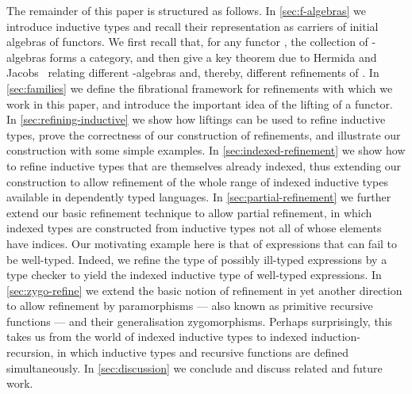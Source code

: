 \documentclass{LMCS}
\begin{document}
The remainder of this paper is structured as follows. In
\autoref{sec:f-algebras} we introduce inductive types and recall their
representation as carriers of initial algebras of functors. We first
recall that, for any functor , the collection of -algebras
forms a category, and then give a key theorem due to Hermida and
Jacobs~\cite{hermida98structural} relating different -algebras and,
thereby, different refinements of . In \autoref{sec:families}
we define the fibrational framework for refinements with which we work
in this paper, and introduce the important idea of the lifting of a
functor. In \autoref{sec:refining-inductive} we show how liftings can
be used to refine inductive types, prove the correctness of our
construction of refinements, and illustrate our construction with some
simple examples.  In \autoref{sec:indexed-refinement} we show how to
refine inductive types that are themselves already indexed, thus
extending our construction to allow refinement of the whole range of
indexed inductive types available in dependently typed languages.  In
\autoref{sec:partial-refinement} we further extend our basic
refinement technique to allow partial refinement, in which indexed
types are constructed from inductive types not all of whose elements
have indices. Our motivating example here is that of expressions that
can fail to be well-typed. Indeed, we refine the type of possibly
ill-typed expressions by a type checker to yield the indexed inductive
type of well-typed expressions. In \autoref{sec:zygo-refine} we extend
the basic notion of refinement in yet another direction to allow
refinement by paramorphisms --- also known as primitive recursive
functions --- and their generalisation zygomorphisms. Perhaps
surprisingly, this takes us from the world of indexed inductive types
to indexed induction-recursion, in which inductive types and recursive
functions are defined simultaneously.  In \autoref{sec:discussion} we
conclude and discuss related and future work.
\end{document}
